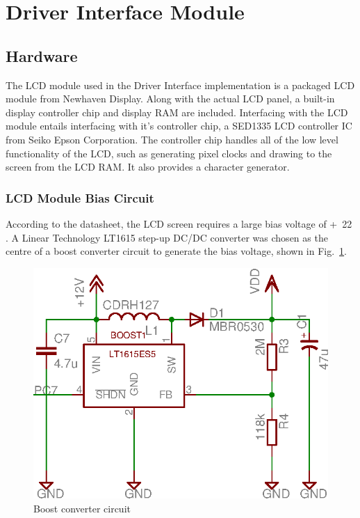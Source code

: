 \section{Driver Interface Module}

\subsection{Hardware}

The LCD module used in the Driver Interface implementation is a packaged LCD module from Newhaven Display. Along with the actual LCD panel, a built-in display controller chip and display RAM are included. Interfacing with the LCD module entails interfacing with it's controller chip, a SED1335 LCD controller IC from Seiko Epson Corporation. The controller chip handles all of the low level functionality of the LCD, such as generating pixel clocks and drawing to the screen from the LCD RAM. It also provides a character generator.

\subsubsection{LCD Module Bias Circuit}

According to the datasheet, the LCD screen requires a large bias voltage of \unit{+22}{\volt} \cite{LCD_Module}. A Linear Technology LT1615 step-up DC/DC converter was chosen as the centre of a boost converter circuit to generate the bias voltage, shown in Fig.\ \ref{fig:lcd_boost_converter}.

\begin{figure}[htp]
 \centering
 \includegraphics[scale=0.8]{implementation/figures/driver_interface_lcd_bias_circuit.eps}
 \caption{Boost converter circuit}
 \label{fig:lcd_boost_converter}
\end{figure}

